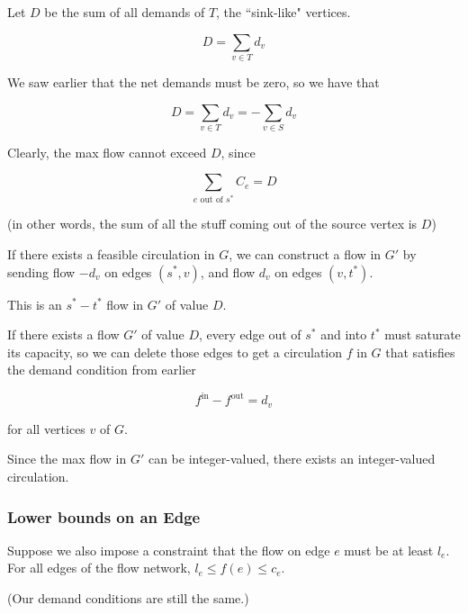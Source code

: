 \documentclass[12pt]{article}
\begin{document}
  Let $D$ be the sum of all demands of $T$, the ``sink-like" vertices.

  \[
    D = \sum_{v \in T} d_v
  \]

  We saw earlier that the net demands must be zero, so we have that

  \[
    D = \sum_{v \in T} d_v = - \sum_{v \in S} d_v
  \]

  {
    Clearly, the max flow cannot exceed $D$, since

    \[
      \sum_{e \text{ out of } s^*} C_e = D
    \]

    (in other words, the sum of all the stuff coming out of the source vertex
    is $D$)

    If there exists a feasible circulation in $G$, we can construct a flow in
    $G'$ by sending flow $-d_v$ on edges $(s^*, v)$, and flow $d_v$ on edges
    $(v, t^*)$.

    This is an $s^* - t^*$ flow in $G'$ of value $D$.

    If there exists a flow $G'$ of value $D$, every edge out of $s^*$ and into
    $t^*$ must saturate its capacity, so we can delete those edges to get a
    circulation $f$ in $G$ that satisfies the demand condition from earlier

    \[
      f^\text{in} - f^\text{out} = d_v
    \]

    for all vertices $v$ of $G$.

    Since the max flow in $G'$ can be integer-valued, there exists an
    integer-valued circulation.
  }

  \subsubsection{Lower bounds on an Edge}

  Suppose we also impose a constraint that the flow on edge $e$ must be at
  least $l_e$. For all edges of the flow network, $l_e \le f(e) \le c_e$.

  (Our demand conditions are still the same.)
\end{document}
